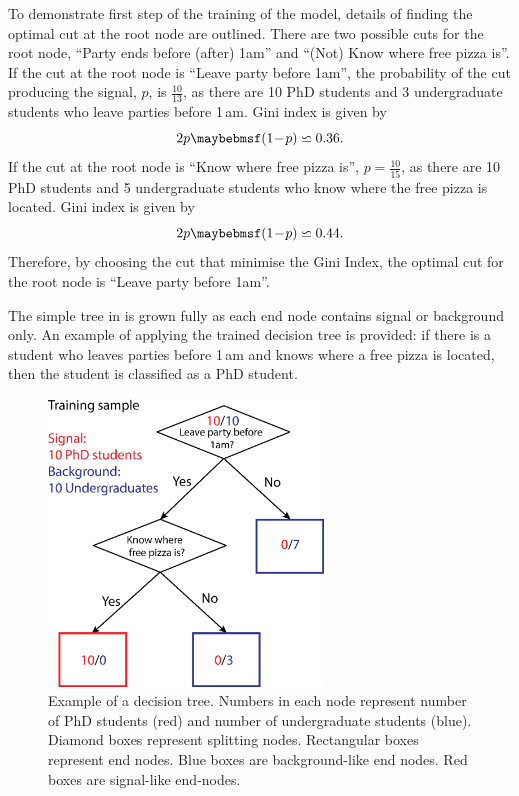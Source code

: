 To demonstrate first step of the training of the model, details of finding the optimal cut at the root node are outlined. There are two possible cuts for the root node, ``Party ends before (after) 1am'' and ``(Not) Know where free pizza is''. If the cut at the root node is ``Leave party before 1am'', the probability of the cut producing the signal, $p$, is $\frac{10}{13}$, as there are 10 PhD students and 3 undergraduate students who leave parties before 1\,am. Gini index is given by
\begin{equation}
2p\parenths{1\!-\!p} \backsimeq 0.36 .
\end{equation}
If the cut at the root node is ``Know where free pizza is'', $p=\frac{10}{15}$, as there are  10 PhD students and 5 undergraduate students who know where the free pizza is located. Gini index is given by
\begin{equation}
2p\parenths{1\!-\!p} \backsimeq 0.44 .
\end{equation}
Therefore, by choosing the cut that minimise the Gini Index, the optimal cut for the root node is ``Leave party before 1am''.

The simple tree in  is grown fully as each end node contains signal or background only. An example of applying the trained decision tree is provided: if there is a student who leaves parties before 1\,am and knows where a free pizza is located, then the student is classified as a PhD student.

\begin{figure}[!htbp]
\includegraphics[width=0.65\textwidth]{doubleHiggs/mva/BDTcomic}
\caption[Example of a decision tree. ]
{Example of a decision tree. Numbers in each node represent number of PhD students (red) and number of undergraduate students (blue). Diamond boxes represent splitting nodes. Rectangular boxes represent end nodes. Blue boxes are background-like end nodes. Red boxes are signal-like end-nodes.}
   \label{fig:doubleHiggsMVAdecisionTree}
\end{figure}

